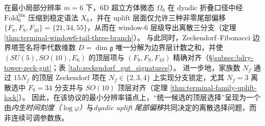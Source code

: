 \begin{theorem}
\label{thm:terminal-6d-microstate-golden-time-gut-branch}
在最小局部分辨率 \(m=6\) 下，6D 超立方体微态 \(\Omega_6\) 在 dyadic 折叠口径中经 \(\mathrm{Fold}^{\mathrm{bin}}_6\) 压缩到稳定语法 \(X_6\)，并在 uplift 层面仅允许三种非零尾部偏移 \(\{F_8,F_9,F_{10}\}=\{21,34,55\}\)，从而在 window-\(6\) 层级导出离散三分支（定理 \ref{thm:terminal-window6-tail-three-branch}）。
与此同时，Zeckendorf--Fibonacci 边界塔签名将李代数维数 \(D=\dim\mathfrak g\) 唯一分解为边界层计数之和，并使 \((SU(5),SO(10),E_6)\) 的顶层项与 \((F_8,F_9,F_{10})\) 精确对齐（\S\ref{subsec:bdry-tower-zeck-gut}；表 \ref{tab:zeckendorf_gut_signatures}）。
进一步地，家族数 \(N_f\) 通过 \(15N_f\) 的顶层 Zeckendorf 项在 \(N_f\in\{2,3,4\}\) 上实现分支锁定，尤其 \(N_f=3\) 离散选中 \(F_9=34\) 分支并与 \(SO(10)\) 顶层对齐（定理 \ref{thm:terminal-family-uplift-lock}）。
因此，在该协议的最小分辨率锚点上，“统一候选的顶层选择”呈现为一个由\emph{内生时间刻度（\(\log\varphi\)）}与\emph{dyadic uplift 尾部偏移}共同决定的离散选择问题，而非连续可调参数族。
\end{theorem}

